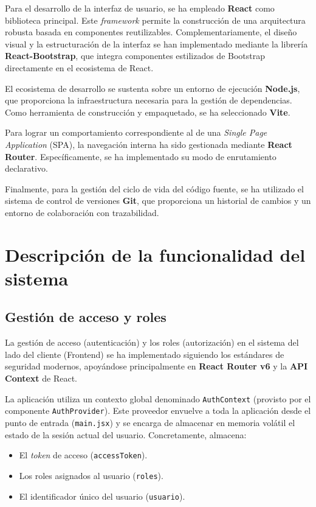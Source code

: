 \documentclass[11pt]{article}
\begin{document}
  Para el desarrollo de la interfaz de usuario, se ha empleado \textbf{React}
  como biblioteca principal. Este \textit{framework} permite la construcción de
  una arquitectura robusta basada en componentes reutilizables.
  Complementariamente, el diseño visual y la estructuración de la interfaz se han
  implementado mediante la librería \textbf{React-Bootstrap}, que integra
  componentes estilizados de Bootstrap directamente en el ecosistema de React.

  El ecosistema de desarrollo se sustenta sobre un entorno de ejecución
  \textbf{Node.js}, que proporciona la infraestructura necesaria para la gestión
  de dependencias. Como herramienta de construcción y empaquetado, se ha
  seleccionado \textbf{Vite}.

  Para lograr un comportamiento correspondiente al de una \textit{Single Page
      Application} (SPA), la navegación interna ha sido gestionada mediante
  \textbf{React Router}. Específicamente, se ha implementado su modo de
  enrutamiento declarativo.

  Finalmente, para la gestión del ciclo de vida del código fuente, se ha
  utilizado el sistema de control de versiones \textbf{Git}, que proporciona un
  historial de cambios y un entorno de colaboración con trazabilidad.

\section{Descripción de la funcionalidad del sistema}

  \subsection{Gestión de acceso y roles}
      La gestión de acceso (autenticación) y los roles (autorización) en el sistema
      del lado del cliente (Frontend) se ha implementado siguiendo los estándares de
      seguridad modernos, apoyándose principalmente en \textbf{React Router v6} y la
      \textbf{API Context} de React.

      La aplicación utiliza un contexto global denominado \texttt{AuthContext}
      (provisto por el componente \texttt{AuthProvider}). Este proveedor envuelve a
      toda la aplicación desde el punto de entrada (\texttt{main.jsx}) y se encarga
      de almacenar en memoria volátil el estado de la sesión actual del usuario.
      Concretamente, almacena:
      \begin{itemize}
          \item El \textit{token} de acceso (\texttt{accessToken}).
          \item Los roles asignados al usuario (\texttt{roles}).
          \item El identificador único del usuario (\texttt{usuario}).
      \end{itemize}
\end{document}
